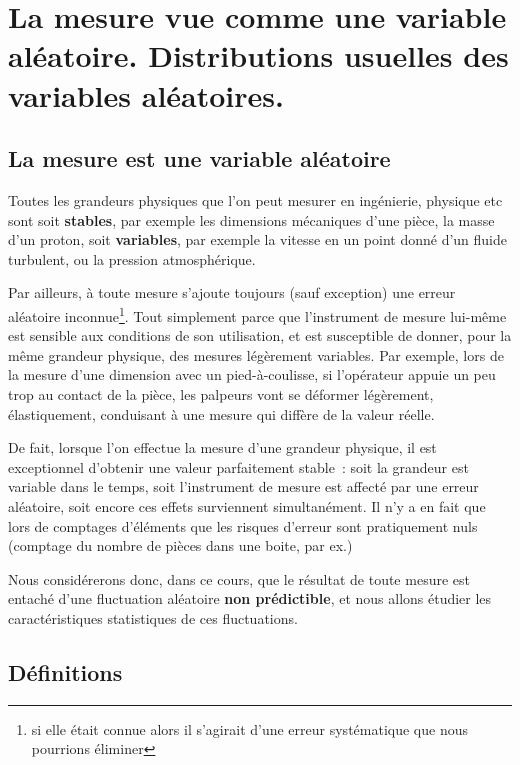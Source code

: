 
\chapter{La mesure vue comme une variable aléatoire. Distributions usuelles des variables aléatoires.}

\section{La mesure est une variable aléatoire}

Toutes les grandeurs physiques que l'on peut mesurer en ingénierie, physique etc sont soit \textbf{stables}, par exemple les dimensions mécaniques d'une pièce, la masse d'un proton, soit \textbf{variables}, par exemple la vitesse en un point donné d'un fluide turbulent, ou la pression atmosphérique.

Par ailleurs, à toute mesure s'ajoute toujours (sauf exception) une erreur aléatoire inconnue\footnote{si elle était connue alors il s'agirait d'une erreur systématique que nous pourrions éliminer}. Tout simplement parce que l'instrument de mesure lui-même est sensible aux conditions de son utilisation, et est susceptible de donner, pour la même grandeur physique, des mesures légèrement variables. Par exemple, lors de la mesure d'une dimension avec un pied-à-coulisse, si l'opérateur appuie un peu trop au contact de la pièce, les palpeurs vont se déformer légèrement, élastiquement, conduisant à une mesure qui diffère de la valeur réelle.

De fait, lorsque l'on effectue la mesure d'une grandeur physique, il est exceptionnel d'obtenir une valeur parfaitement stable~: soit la grandeur est variable dans le temps, soit l'instrument de mesure est affecté par une erreur aléatoire, soit encore ces effets surviennent simultanément. Il n'y a en fait que lors de comptages d'éléments que les risques d'erreur sont pratiquement nuls (comptage du nombre de pièces dans une boite, par ex.)

Nous considérerons donc, dans ce cours, que le résultat de toute mesure est entaché d'une fluctuation aléatoire \textbf{non prédictible}, et nous allons étudier les caractéristiques statistiques de ces fluctuations.

\section{Définitions}

